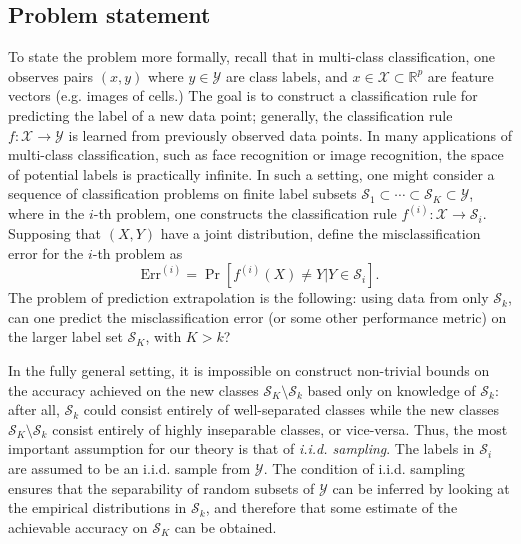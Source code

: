\documentclass[12pt]{article}
\begin{document}
\subsection{Problem statement}

To state the problem more formally, recall that in multi-class
classification, one observes pairs $(x, y)$ where $y \in \mathcal{Y}$
are class labels, and $x \in \mathcal{X} \subset \mathbb{R}^p$ are
feature vectors (e.g. images of cells.)  The goal is to construct a
classification rule for predicting the label of a new data point;
generally, the classification rule $f: \mathcal{X} \to \mathcal{Y}$ is
learned from previously observed data points.  In many applications of
multi-class classification, such as face recognition or image
recognition, the space of potential labels is practically infinite.
In such a setting, one might consider a sequence of classification
problems on finite label subsets
$\mathcal{S}_1 \subset \cdots \subset \mathcal{S}_K \subset \mathcal{Y}$,
where in the $i$-th problem, one constructs the classification rule
$f^{(i)}:\mathcal{X} \to \mathcal{S}_i$.  Supposing that $(X, Y)$ have
a joint distribution, define the misclassification error for the
$i$-th problem as
\[
\text{Err}^{(i)} = \Pr[f^{(i)}(X) \neq Y|Y \in \mathcal{S}_i].
\]
The problem of prediction extrapolation is the following: using data
from only $\mathcal{S}_k$, can one predict the misclassification error
(or some other performance metric) on the larger label set
$\mathcal{S}_K$, with $K> k$?

In the fully general setting, it is impossible on construct
non-trivial bounds on the accuracy achieved on the new classes
$\mathcal{S}_K \setminus \mathcal{S}_k$ based only on knowledge of
$\mathcal{S}_k$: after all, $\mathcal{S}_k$ could consist entirely of
well-separated classes while the new classes
$\mathcal{S}_K \setminus \mathcal{S}_k$ consist entirely of highly
inseparable classes, or vice-versa.  Thus, the most important
assumption for our theory is that of \emph{i.i.d. sampling}.  The
labels in $\mathcal{S}_i$ are assumed to be an i.i.d. sample from
$\mathcal{Y}$.  The condition of i.i.d. sampling ensures that the
separability of random subsets of $\mathcal{Y}$ can be inferred by
looking at the empirical distributions in $\mathcal{S}_k$, and
therefore that some estimate of the achievable accuracy on
$\mathcal{S}_K$ can be obtained.
\end{document}
